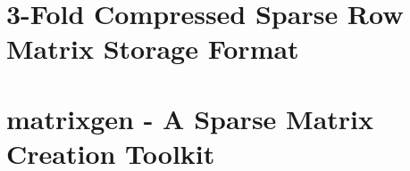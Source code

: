 \documentclass[10pt,usenames,dvipsnames]{report}
\begin{document}

  


  

  \tableofcontents
  \newpage
  \listoffigures

  \part{3-Fold Compressed Sparse Row Matrix Storage Format}

    
    
    
    

  \part{matrixgen - A Sparse Matrix Creation Toolkit}

    
    

  \printbibliography


  

  \todos
\end{document}
